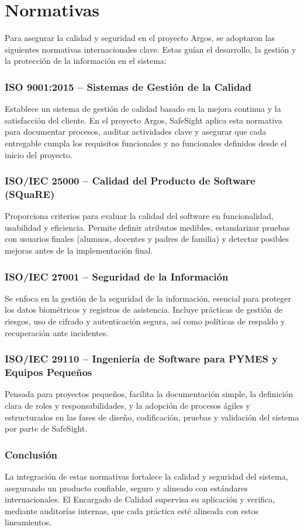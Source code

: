 \section{Normativas}

Para asegurar la calidad y seguridad en el proyecto Argos, se adoptaron las siguientes normativas internacionales clave. Estas guían el desarrollo, la gestión y la protección de la información en el sistema:

\subsubsection*{ISO 9001:2015 – Sistemas de Gestión de la Calidad}
Establece un sistema de gestión de calidad basado en la mejora continua y la satisfacción del cliente. En el proyecto Argos, SafeSight aplica esta normativa para documentar procesos, auditar actividades clave y asegurar que cada entregable cumpla los requisitos funcionales y no funcionales definidos desde el inicio del proyecto.

\subsubsection*{ISO/IEC 25000 – Calidad del Producto de Software (SQuaRE)}
Proporciona criterios para evaluar la calidad del software en funcionalidad, usabilidad y eficiencia. Permite definir atributos medibles, estandarizar pruebas con usuarios finales (alumnos, docentes y padres de familia) y detectar posibles mejoras antes de la implementación final.

\subsubsection*{ISO/IEC 27001 – Seguridad de la Información}
Se enfoca en la gestión de la seguridad de la información, esencial para proteger los datos biométricos y registros de asistencia. Incluye prácticas de gestión de riesgos, uso de cifrado y autenticación segura, así como políticas de respaldo y recuperación ante incidentes.

\subsubsection*{ISO/IEC 29110 – Ingeniería de Software para PYMES y Equipos Pequeños}
Pensada para proyectos pequeños, facilita la documentación simple, la definición clara de roles y responsabilidades, y la adopción de procesos ágiles y estructurados en las fases de diseño, codificación, pruebas y validación del sistema por parte de SafeSight.

\subsubsection*{Conclusión}
La integración de estas normativas fortalece la calidad y seguridad del sistema, asegurando un producto confiable, seguro y alineado con estándares internacionales. El Encargado de Calidad supervisa su aplicación y verifica, mediante auditorías internas, que cada práctica esté alineada con estos lineamientos.
